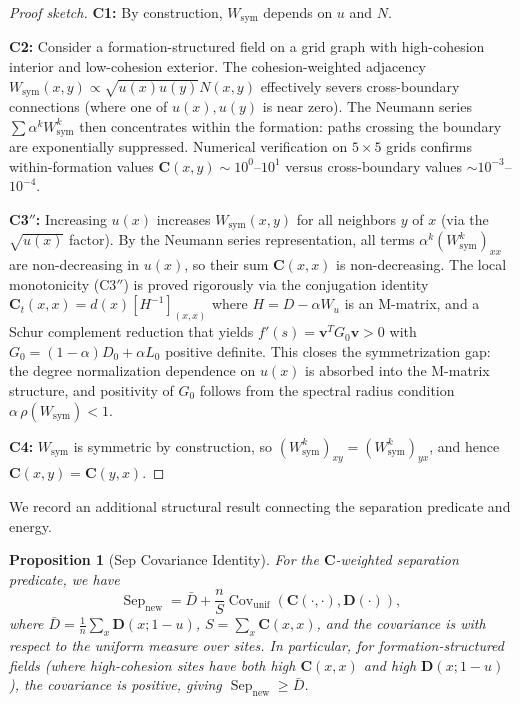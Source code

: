 \documentclass[lettersize,journal]{IEEEtran}
\newtheorem{proposition}[theorem]{Proposition}
\DeclareMathOperator{\Sep}{Sep}
\begin{document}
\begin{proof}[Proof sketch]
\textbf{C1:} By construction, $W_{\mathrm{sym}}$ depends on $u$ and $N$.

\textbf{C2:} Consider a formation-structured field on a grid graph with high-cohesion interior and low-cohesion exterior. The cohesion-weighted adjacency $W_{\mathrm{sym}}(x,y) \propto \sqrt{u(x) u(y)} N(x,y)$ effectively severs cross-boundary connections (where one of $u(x), u(y)$ is near zero). The Neumann series $\sum \alpha^k W_{\mathrm{sym}}^k$ then concentrates within the formation: paths crossing the boundary are exponentially suppressed. Numerical verification on $5\times 5$ grids confirms within-formation values $\mathbf{C}(x,y) \sim 10^0$--$10^1$ versus cross-boundary values $\sim 10^{-3}$--$10^{-4}$.

\textbf{C3$''$:} Increasing $u(x)$ increases $W_{\mathrm{sym}}(x,y)$ for all neighbors $y$ of $x$ (via the $\sqrt{u(x)}$ factor). By the Neumann series representation, all terms $\alpha^k (W_{\mathrm{sym}}^k)_{xx}$ are non-decreasing in $u(x)$, so their sum $\mathbf{C}(x,x)$ is non-decreasing. The local monotonicity (C3$''$) is proved rigorously via the conjugation identity $\mathbf{C}_t(x,x) = d(x)[H^{-1}]_{(x,x)}$ where $H = D - \alpha W_u$ is an M-matrix, and a Schur complement reduction that yields $f'(s) = \mathbf{v}^T G_0 \mathbf{v} > 0$ with $G_0 = (1-\alpha)D_0 + \alpha L_0$ positive definite. This closes the symmetrization gap: the degree normalization dependence on $u(x)$ is absorbed into the M-matrix structure, and positivity of $G_0$ follows from the spectral radius condition $\alpha\,\rho(W_{\mathrm{sym}}) < 1$.

\textbf{C4:} $W_{\mathrm{sym}}$ is symmetric by construction, so $(W_{\mathrm{sym}}^k)_{xy} = (W_{\mathrm{sym}}^k)_{yx}$, and hence $\mathbf{C}(x,y) = \mathbf{C}(y,x)$.
\end{proof}

We record an additional structural result connecting the separation predicate and energy.

\begin{proposition}[Sep Covariance Identity]
\label{prop:sep-identity}
For the $\mathbf{C}$-weighted separation predicate, we have
\begin{equation}
\Sep_{\mathrm{new}} = \bar{D} + \frac{n}{S}\operatorname{Cov}_{\mathrm{unif}}(\mathbf{C}(\cdot,\cdot), \mathbf{D}(\cdot)),
\end{equation}
where $\bar{D} = \frac{1}{n}\sum_x \mathbf{D}(x; 1-u)$, $S = \sum_x \mathbf{C}(x,x)$, and the covariance is with respect to the uniform measure over sites. In particular, for formation-structured fields (where high-cohesion sites have both high $\mathbf{C}(x,x)$ and high $\mathbf{D}(x;1-u)$), the covariance is positive, giving $\Sep_{\mathrm{new}} \geq \bar{D}$.
\end{proposition}
\end{document}
